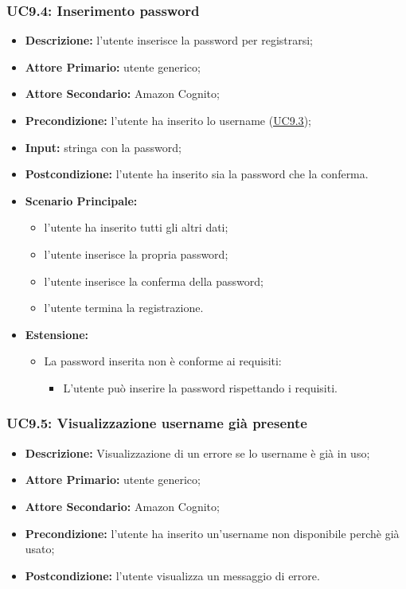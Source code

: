 \subsubsection{UC9.4: Inserimento password}
\label{sec:UC9.4}
\begin{itemize}
    \item \textbf{Descrizione:} l'utente inserisce la password per registrarsi;
    \item \textbf{Attore Primario:} utente generico;
    \item \textbf{Attore Secondario:} Amazon Cognito;
    \item \textbf{Precondizione:} l'utente ha inserito lo username (\hyperref[sec:UC9.3]{\underline{UC9.3}});
    \item \textbf{Input:} stringa con la password;
    \item \textbf{Postcondizione:} l'utente ha inserito sia la password che la conferma.
    \item \textbf{Scenario Principale:}
          \begin{itemize}
              \item l'utente ha inserito tutti gli altri dati;
              \item l'utente inserisce la propria password;
              \item l'utente inserisce la conferma della password;
              \item l'utente termina la registrazione.
          \end{itemize}
    \item \textbf{Estensione:}
          \begin{itemize}
              \item La password inserita non è conforme ai requisiti:
                    \begin{itemize}
                        \item L'utente può inserire la password rispettando i requisiti.
                    \end{itemize}
          \end{itemize}
\end{itemize}


\subsubsection{UC9.5: Visualizzazione username già presente}
\label{sec:UC9.5}
\begin{itemize}
    \item \textbf{Descrizione:} Visualizzazione di un errore se lo username è già in uso;
    \item \textbf{Attore Primario:} utente generico;
    \item \textbf{Attore Secondario:} Amazon Cognito;
    \item \textbf{Precondizione:} l'utente ha inserito un'username non disponibile perchè già usato;
    \item \textbf{Postcondizione:} l'utente visualizza un messaggio di errore.
\end{itemize}

